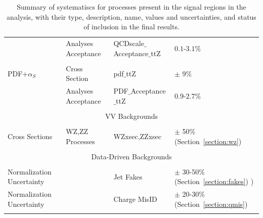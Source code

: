 \begin{table}[htbp]
\begin{center}
{\begin{tabular}{|llll|}
                                            & Analyses Acceptance &    QCDscale$\_$Acceptance$\_$ttZ             &    $0.1$-$3.1\%$          \\
         & &  &               \\
      PDF+$\alpha_S$     &   Cross Section  &    pdf$\_$ttZ         &     $\pm$ 9$\%$       \\
                                      &   Analyses Acceptance  &    PDF$\_$Acceptance$\_$ttZ         &     $0.9$-$2.7\%$      \\
         & &  &               \\
     \hline
      \multicolumn{4}{|c|}{VV Backgrounds}\\
     \hline
         &   & &              \\
      Cross Sections             &   WZ,ZZ Processes       &    WZxsec,ZZxsec        &     $\pm$ 50$\%$   (Section~\ref{section:wz})   \\
          &  &  &             \\
     \hline
      \multicolumn{4}{|c|}{Data-Driven Backgrounds}\\
     \hline
          &  &  &             \\
           Normalization Uncertainty                 &         &    Jet Fakes       &     $\pm$ 30-50$\%$ (Section~\ref{section:fakes})  )   \\
           Normalization Uncertainty                 &         &    Charge MisID    &     $\pm$ 20-30$\%$ (Section~\ref{section:qmis})      \\
          &  &  &             \\
     \hline
    \end{tabular}
    }
    \caption{ Summary of systematiscs for processes present in the signal regions in the analysis, with their
    type, description, name, values and uncertainties, and status of inclusion in the final results.}
    \label{table:systematics_summary}
    \end{center}
    \end{table} 


